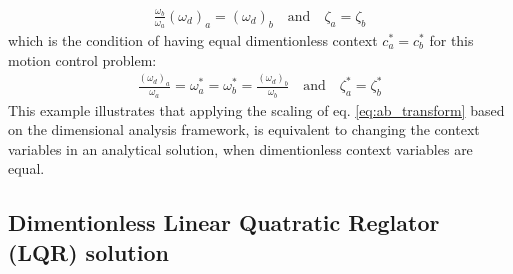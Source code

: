 \begin{align}
\frac{\omega_b}{\omega_a} (\omega_d )_a = (\omega_d )_b 
\quad \text{and}  \quad \zeta_a = \zeta_b
\end{align}
which is the condition of having equal dimentionless context $c_a^* = c_b^*$ for this motion control problem:
\begin{align}
\frac{(\omega_d )_a}{\omega_a}  = \omega^*_a =  \omega^*_b = \frac{(\omega_d )_b}{\omega_b} 
\quad \text{and}  \quad \zeta_a^* = \zeta_b^*
\end{align}
This example illustrates that applying the scaling of eq. \eqref{eq:ab_transform} based on the dimensional analysis framework, is equivalent to changing the context variables in an analytical solution, when dimentionless context variables are equal.


\subsection{ Dimentionless Linear Quatratic Reglator (LQR) solution}
\label{sec:lqr}

